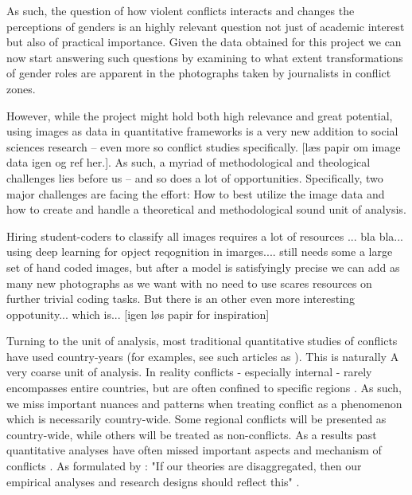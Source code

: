 \documentclass[a4paper]{article}
\begin{document}
As such, the question of how violent conflicts interacts and changes the perceptions of genders is an highly relevant question not just of academic interest but also of practical importance. Given the data obtained for this project we can now start answering such questions by examining to what extent transformations of gender roles are apparent in the photographs taken by journalists in conflict zones.\par

However, while the project might hold both high relevance and great potential, using images as data in quantitative frameworks is a very new addition to social sciences research -- even more so conflict studies specifically. [læs papir om image data igen og ref her.]. As such, a myriad of methodological and theological challenges lies before us -- and so does a lot of opportunities. Specifically, two major challenges are facing the effort: How to best utilize the image data and how to create and handle a theoretical and methodological sound unit of analysis.\par\par



Hiring student-coders to classify all images requires a lot of resources ... bla bla... using deep learning for opject reqognition in imarges.... still needs some a large set of hand coded images, but after a model is satisfyingly precise we can add as many new photographs as we want with no need to use scares resources on further trivial coding tasks. But there is an other even more interesting oppotunity... which is... [igen løs papir for inspiration]

Turning to the unit of analysis, most traditional quantitative studies of conflicts have used country-years (for examples, see such articles as \cite{Collier_Hoeffler_1998, Fearon_Laitin_2003, Collier_Hoeffler_2004, Fearon_2004, Ross_2004, Fearon_2005, Hegre_Sambanis_2006, Goldstone_2010}). This is naturally A very coarse unit of analysis. In reality conflicts - especially internal - rarely encompasses entire countries, but are often confined to specific regions \cite[487]{Cederman_Gleditsch_2009}. As such, we miss important nuances and patterns when treating conflict as a phenomenon which is necessarily country-wide. Some regional conflicts will be presented as country-wide, while others will be treated as non-conflicts. As a results past quantitative analyses have often missed important aspects and mechanism of conflicts \cite{Cederman_Gleditsch_2009, Cederman_Gleditsch_Buhaug_2013}. As formulated by \cite{Cederman_Gleditsch_2009}: "If our theories are disaggregated, then our empirical analyses and research designs should reflect this" \citep[490]{Cederman_Gleditsch_2009}.\par 
\end{document}
